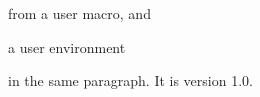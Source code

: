  from a user macro, and \begin{flmUEnote}a user environment\end{flmUEnote}
in the same paragraph. It is version 1.0.
\providecommand\flmUDhello[1]{Hello, #1!}
\endinput
